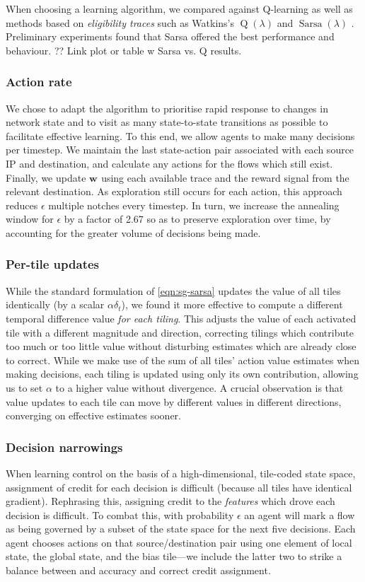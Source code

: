 \documentclass[10pt, times, conference, letterpaper]{IEEEtran}
\newcommand{\wvec}[1]{\ensuremath{\bm{w}_{#1}}}
\begin{document}
When choosing a learning algorithm, we compared against Q-learning as well as methods based on \emph{eligibility traces} such as Watkins's $\operatorname{Q}(\lambda)$ \cite[pp. 312--314]{RL2E} and $\operatorname{Sarsa}(\lambda)$ \cite[pp. 305]{RL2E}.
Preliminary experiments found that Sarsa offered the best performance and behaviour.
?? Link plot or table w Sarsa vs. Q results.

\subsubsection{Action rate}
We chose to adapt the algorithm to prioritise rapid response to changes in network state and to visit as many state-to-state transitions as possible to facilitate effective learning.
To this end, we allow agents to make many decisions per timestep.
We maintain the last state-action pair associated with each source IP and destination, and calculate any actions for the flows which still exist.
Finally, we update $\wvec{}$ using each available trace and the reward signal from the relevant destination.
As exploration still occurs for each action, this approach reduces $\epsilon$ multiple notches every timestep.
In turn, we increase the annealing window for $\epsilon$ by a factor of \num{2.67} so as to preserve exploration over time, by accounting for the greater volume of decisions being made.

\subsubsection{Per-tile updates}
While the standard formulation of \cref{eqn:sg-sarsa} updates the value of all tiles identically (by a scalar $\alpha \delta_t$), we found it more effective to compute a different temporal difference value \emph{for each tiling}.
This adjusts the value of each activated tile with a different magnitude and direction, correcting tilings which contribute too much or too little value without disturbing estimates which are already close to correct.
While we make use of the sum of all tiles' action value estimates when making decisions, each tiling is updated using only its own contribution, allowing us to set $\alpha$ to a higher value without divergence.
A crucial observation is that value updates to each tile can move by different values in different directions, converging on effective estimates sooner.

\subsubsection{Decision narrowings}
When learning control on the basis of a high-dimensional, tile-coded state space, assignment of credit for each decision is difficult (because all tiles have identical gradient).
Rephrasing this, assigning credit to the \emph{features} which drove each decision is difficult.
To combat this, with probability $\epsilon$ an agent will mark a flow as being governed by a subset of the state space for the next five decisions.
Each agent chooses actions on that source/destination pair using one element of local state, the global state, and the bias tile---we include the latter two to strike a balance between and accuracy and correct credit assignment.
\end{document}
